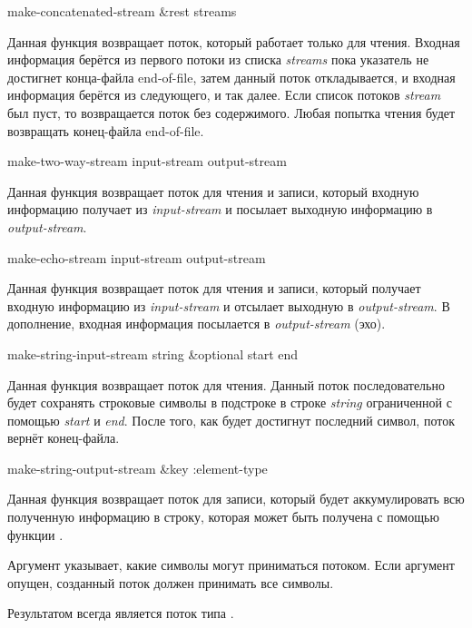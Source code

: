 \begin{defun}[Функция]
make-concatenated-stream &rest streams

Данная функция возвращает поток, который работает только для чтения.
Входная информация берётся из первого потоки из списка \emph{streams} пока
указатель не достигнет конца-файла end-of-file, затем данный поток
откладывается, и входная информация берётся из следующего, и так далее. Если
список потоков \emph{stream} был пуст, то возвращается поток без
содержимого. Любая попытка чтения будет возвращать конец-файла end-of-file. 
\end{defun}

\begin{defun}[Функция]
make-two-way-stream input-stream output-stream

Данная функция возвращает поток для чтения и записи, который входную информацию
получает из \emph{input-stream} и посылает выходную информацию в \emph{output-stream}.
\end{defun}

\begin{defun}[Функция]
make-echo-stream input-stream output-stream

Данная функция возвращает поток для чтения и записи, который получает входную
информацию из \emph{input-stream} и отсылает выходную в \emph{output-stream}. В
дополнение, входная информация посылается в \emph{output-stream} (эхо).
\end{defun}

\begin{defun}[Функция]
make-string-input-stream string &optional start end

Данная функция возвращает поток для чтения.
Данный поток последовательно будет сохранять строковые символы в подстроке в
строке \emph{string} ограниченной с помощью \emph{start} и \emph{end}. После
того, как будет достигнут последний символ, поток вернёт конец-файла.
\end{defun}

\begin{defun}[Функция]
make-string-output-stream &key :element-type

Данная функция возвращает поток для записи, который будет аккумулировать всю
полученную информацию в строку, которая может быть получена с помощью функции
.

Аргумент  указывает, какие символы могут приниматься
потоком. Если аргумент  опущен, созданный поток должен
принимать все символы.

Результатом  всегда является поток типа
.
\end{defun}

